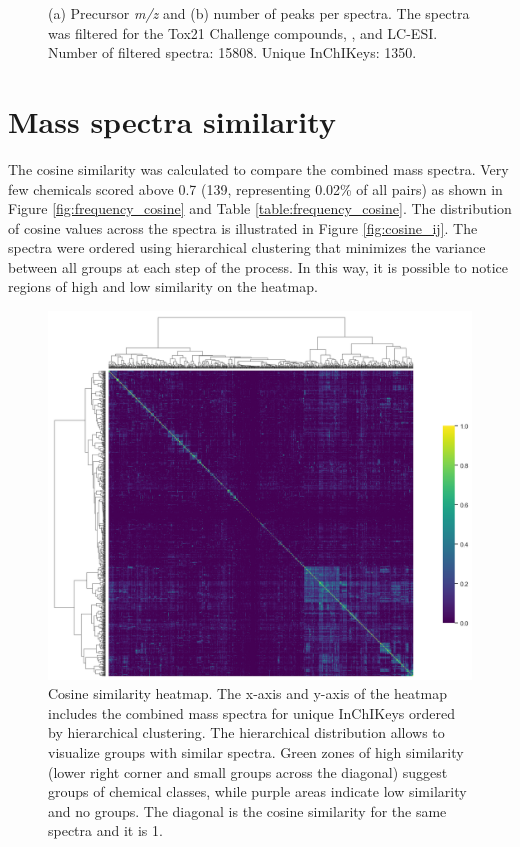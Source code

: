 \begin{figure}[H]
\begin{subfigure}[a]{0.35\textwidth}
 		 \caption{}
 	\end{subfigure}
\caption{(a) Precursor \textit{m/z} and (b) number of peaks per spectra. The spectra was filtered for the Tox21 Challenge compounds, \tMS{}, and LC-ESI. Number of filtered spectra: 15808. Unique InChIKeys: 1350.}
\label{fig:library}
\end{figure}



\section*{Mass spectra similarity}

The cosine similarity was calculated to compare the combined mass spectra. Very few chemicals scored above 0.7 (139, representing 0.02\% of all pairs) as shown in Figure \ref{fig:frequency_cosine} and Table \ref{table:frequency_cosine}. The distribution of cosine values across the spectra is illustrated in Figure \ref{fig:cosine_ij}. The spectra were ordered using hierarchical clustering that minimizes the variance between all groups at each step of the process. In this way, it is possible to notice regions of high and low similarity on the heatmap. 
\begin{figure}[h]
  \includegraphics[width=1\textwidth]{include/img/heatmap.png}
  \caption{Cosine similarity heatmap. The x-axis and y-axis of the heatmap includes the combined mass spectra for unique InChIKeys ordered by hierarchical clustering. The hierarchical distribution allows to visualize groups with similar spectra. Green zones of high similarity (lower right corner and small groups across the diagonal) suggest groups of chemical classes, while purple areas indicate low similarity and no groups. The diagonal is the cosine similarity for the same spectra and it is 1. }
  \label{fig:cosine}
\end{figure}

